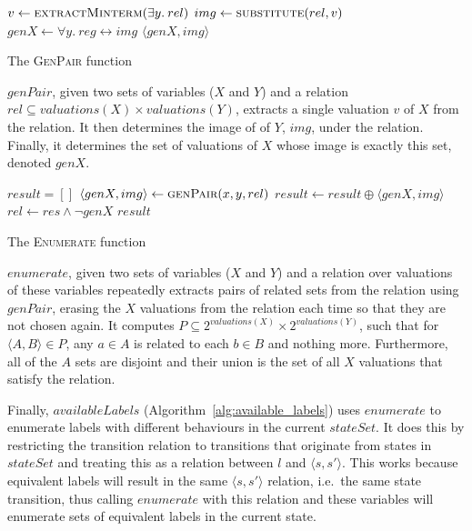 \begin{algorithm}
\begin{algorithmic}

    \State $v \gets \Call{extractMinterm}{\exists y. \: rel}$
    \State $img      \gets \Call{substitute}{rel, v}$
    \State $genX     \gets \forall y. \: reg \leftrightarrow img$
    \State\Return $\langle genX, img \rangle$
\EndFunction

\end{algorithmic}
\caption{The \textsc{GenPair} function}
\label{alg:gen_pair}
\end{algorithm}

$genPair$, given two sets of variables ($X$ and $Y$) and a relation $rel \subseteq valuations(X) \times valuations (Y)$, extracts a single valuation $v$ of $X$ from the relation. It then determines the image of of $Y$, $img$, under the relation. Finally, it determines the set of valuations of $X$ whose image is exactly this set, denoted $genX$. 

\begin{algorithm}
\begin{algorithmic}

    \State $result = []$
        \State $\langle genX, img \rangle \gets \Call{genPair}{x, y, rel}$
        \State $result \gets result \oplus \langle genX, img \rangle$
        \State $rel \gets res \land \neg genX$
    \EndWhile
    \State\Return $result$
\EndFunction

\end{algorithmic}
\caption{The \textsc{Enumerate} function}
\label{alg:enumerate}
\end{algorithm}

$enumerate$, given two sets of variables ($X$ and $Y$) and a relation over valuations of these variables repeatedly extracts pairs of related sets from the relation using $genPair$, erasing the $X$ valuations from the relation each time so that they are not chosen again. It computes $P \subseteq 2^{valuations(X)} \times 2^{valuations(Y)}$, such that for $\langle A, B \rangle \in P$, any $a \in A$ is related to each $b \in B$ and nothing more. Furthermore, all of the $A$ sets are disjoint and their union is the set of all $X$ valuations that satisfy the relation.

Finally, $availableLabels$ (Algorithm~\ref{alg:available_labels}) uses $enumerate$ to enumerate labels with different behaviours in the current $stateSet$. It does this by restricting the transition relation to transitions that originate from states in $stateSet$ and treating this as a relation between $l$ and $\langle s, s' \rangle$. This works because equivalent labels will result in the same $\langle s, s' \rangle$ relation, i.e.\ the same state transition, thus calling $enumerate$ with this relation and these variables will enumerate sets of equivalent labels in the current state.

